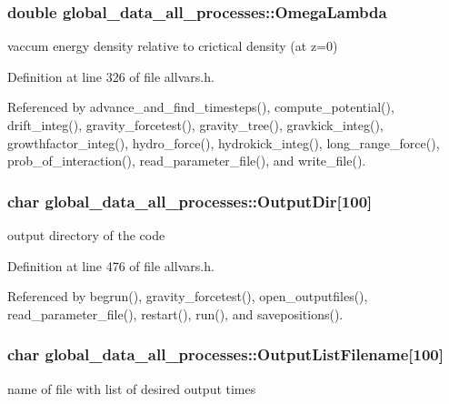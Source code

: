 \hypertarget{structglobal__data__all__processes_ae272abeafbcb16230374a903a3e4e298}{
\subsubsection[{OmegaLambda}]{\setlength{\rightskip}{0pt plus 5cm}double {\bf global\_\-data\_\-all\_\-processes::OmegaLambda}}}
\label{structglobal__data__all__processes_ae272abeafbcb16230374a903a3e4e298}
vaccum energy density relative to crictical density (at z=0) 

Definition at line 326 of file allvars.h.



Referenced by advance\_\-and\_\-find\_\-timesteps(), compute\_\-potential(), drift\_\-integ(), gravity\_\-forcetest(), gravity\_\-tree(), gravkick\_\-integ(), growthfactor\_\-integ(), hydro\_\-force(), hydrokick\_\-integ(), long\_\-range\_\-force(), prob\_\-of\_\-interaction(), read\_\-parameter\_\-file(), and write\_\-file().

\hypertarget{structglobal__data__all__processes_aebda5d1b80cfb767b9668d7858c36bcc}{
\subsubsection[{OutputDir}]{\setlength{\rightskip}{0pt plus 5cm}char {\bf global\_\-data\_\-all\_\-processes::OutputDir}\mbox{[}100\mbox{]}}}
\label{structglobal__data__all__processes_aebda5d1b80cfb767b9668d7858c36bcc}
output directory of the code 

Definition at line 476 of file allvars.h.



Referenced by begrun(), gravity\_\-forcetest(), open\_\-outputfiles(), read\_\-parameter\_\-file(), restart(), run(), and savepositions().

\hypertarget{structglobal__data__all__processes_a063be13ecadec873ebaad1b3645a5323}{
\subsubsection[{OutputListFilename}]{\setlength{\rightskip}{0pt plus 5cm}char {\bf global\_\-data\_\-all\_\-processes::OutputListFilename}\mbox{[}100\mbox{]}}}
\label{structglobal__data__all__processes_a063be13ecadec873ebaad1b3645a5323}
name of file with list of desired output times 

